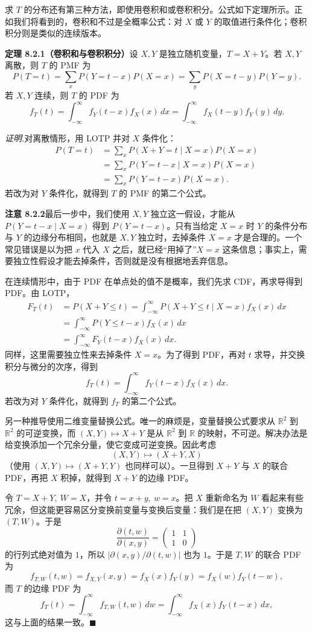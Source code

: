 \documentclass[UTF8,12pt,a4paper,fontset=fandol]{ctexart}
\begin{document}
求 $T$ 的分布还有第三种方法，即使用卷积和或卷积积分。公式如下定理所示。正如我们将看到的，卷积和不过是全概率公式：对 $X$ 或 $Y$ 的取值进行条件化；卷积积分则是类似的连续版本。

\noindent\textbf{定理 8.2.1（卷积和与卷积积分）}\quad 设 $X,Y$ 是独立随机变量，$T=X+Y$。若 $X,Y$ 离散，则 $T$ 的 PMF 为
\[
  P(T=t)=\sum_x P(Y=t-x)P(X=x)
  =\sum_y P(X=t-y)P(Y=y).
\]
若 $X,Y$ 连续，则 $T$ 的 PDF 为
\[
  f_T(t)=\int_{-\infty}^{\infty} f_Y(t-x)f_X(x)\,dx
  =\int_{-\infty}^{\infty} f_X(t-y)f_Y(y)\,dy.
\]

\noindent\textit{证明.}\quad 对离散情形，用 LOTP 并对 $X$ 条件化：
\[
\begin{aligned}
  P(T=t)
  &=\sum_x P(X+Y=t\mid X=x)P(X=x)\\
  &=\sum_x P(Y=t-x\mid X=x)P(X=x)\\
  &=\sum_x P(Y=t-x)P(X=x).
\end{aligned}
\]
若改为对 $Y$ 条件化，就得到 $T$ 的 PMF 的第二个公式。

\noindent\textbf{注意 8.2.2}\quad 最后一步中，我们使用 $X,Y$ 独立这一假设，才能从 $P(Y=t-x\mid X=x)$ 得到 $P(Y=t-x)$。只有当给定 $X=x$ 时 $Y$ 的条件分布与 $Y$ 的边缘分布相同，也就是 $X,Y$ 独立时，去掉条件 $X=x$ 才是合理的。一个常见错误是以为把 $x$ 代入 $X$ 之后，就已经“用掉了”$X=x$ 这条信息；事实上，需要独立性假设才能去掉条件，否则就是没有根据地丢弃信息。

在连续情形中，由于 PDF 在单点处的值不是概率，我们先求 CDF，再求导得到 PDF。由 LOTP，
\[
\begin{aligned}
  F_T(t)
  &=P(X+Y\le t)
    =\int_{-\infty}^{\infty}P(X+Y\le t\mid X=x)f_X(x)\,dx\\
  &=\int_{-\infty}^{\infty}P(Y\le t-x)f_X(x)\,dx\\
  &=\int_{-\infty}^{\infty}F_Y(t-x)f_X(x)\,dx.
\end{aligned}
\]
同样，这里需要独立性来去掉条件 $X=x$。为了得到 PDF，再对 $t$ 求导，并交换积分与微分的次序，得到
\[
  f_T(t)=\int_{-\infty}^{\infty}f_Y(t-x)f_X(x)\,dx.
\]
若改为对 $Y$ 条件化，就得到 $f_T$ 的第二个公式。

另一种推导使用二维变量替换公式。唯一的麻烦是，变量替换公式要求从 $\mathbb R^2$ 到 $\mathbb R^2$ 的可逆变换，而 $(X,Y)\mapsto X+Y$ 是从 $\mathbb R^2$ 到 $\mathbb R$ 的映射，不可逆。解决办法是给变换添加一个冗余分量，使它变成可逆变换。因此考虑
\[
  (X,Y)\mapsto (X+Y,X)
\]
（使用 $(X,Y)\mapsto (X+Y,Y)$ 也同样可以）。一旦得到 $X+Y$ 与 $X$ 的联合 PDF，再把 $X$ 积掉，就得到 $X+Y$ 的边缘 PDF。

令 $T=X+Y,\ W=X$，并令 $t=x+y,\ w=x$。把 $X$ 重新命名为 $W$ 看起来有些冗余，但这能更容易区分变换前变量与变换后变量：我们是在把 $(X,Y)$ 变换为 $(T,W)$。于是
\[
  \frac{\partial(t,w)}{\partial(x,y)}
  =
  \begin{pmatrix}
    1 & 1\\
    1 & 0
  \end{pmatrix}
\]
的行列式绝对值为 $1$，所以 $\left|\partial(x,y)/\partial(t,w)\right|$ 也为 $1$。于是 $T,W$ 的联合 PDF 为
\[
  f_{T,W}(t,w)=f_{X,Y}(x,y)=f_X(x)f_Y(y)=f_X(w)f_Y(t-w),
\]
而 $T$ 的边缘 PDF 为
\[
  f_T(t)=\int_{-\infty}^{\infty}f_{T,W}(t,w)\,dw
  =\int_{-\infty}^{\infty}f_X(x)f_Y(t-x)\,dx,
\]
这与上面的结果一致。$\blacksquare$
\end{document}
